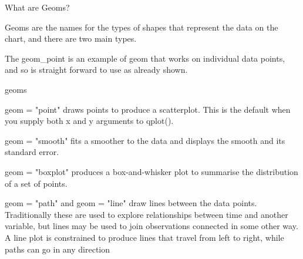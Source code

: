 \documentclass{beamer}
\begin{document}
What are Geoms?

Geoms are the names for the types of shapes that represent the data on the chart, and there are two main types.

The geom_point is an example of geom that works on individual data points, and so is straight forward to use as already shown.

geoms

geom = "point" draws points to produce a scatterplot. This is the default when you supply both x and y arguments to qplot().

geom = "smooth" fits a smoother to the data and displays the smooth and its standard error.

geom = "boxplot" produces a box-and-whisker plot to summarise the distribution of a set of points.

geom = "path" and geom = "line" draw lines between the data points. Traditionally these are used to explore relationships between time and another variable, but lines may be used to join observations connected in some other way. A line plot is constrained to produce lines that travel from left to right, while paths can go in any direction
\end{document}
